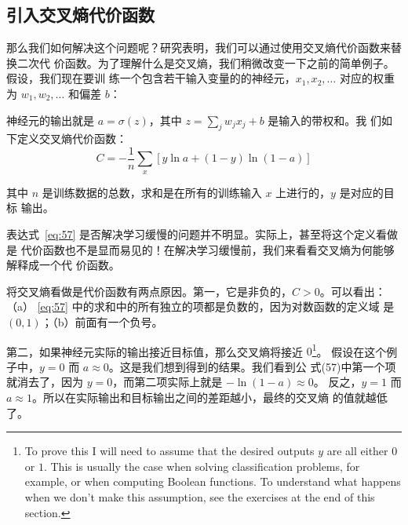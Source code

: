 \subsection{引入交叉熵代价函数}
\label{sec:introducing_the_cross-entropy_cost_function}

那么我们如何解决这个问题呢？研究表明，我们可以通过使用交叉熵代价函数来替换二次代
价函数。为了理解什么是交叉熵，我们稍微改变一下之前的简单例子。假设，我们现在要训
练一个包含若干输入变量的的神经元，$x_1, x_2, \ldots$ 对应的权重为 $w_1, w_2,
\ldots$ 和偏差 $b$：

\begin{center}
\end{center}

神经元的输出就是 $a = \sigma(z)$，其中 $z = \sum_j w_j x_j+b$ 是输入的带权和。我
们如下定义交叉熵代价函数：
\begin{equation} 
  C = -\frac{1}{n} \sum_x \left[y \ln a + (1-y ) \ln (1-a) \right]
\label{eq:57}\tag{57}
\end{equation}

其中 $n$ 是训练数据的总数，求和是在所有的训练输入 $x$ 上进行的，$y$ 是对应的目标
输出。

表达式~\eqref{eq:57} 是否解决学习缓慢的问题并不明显。实际上，甚至将这个定义看做是
代价函数也不是显而易见的！在解决学习缓慢前，我们来看看交叉熵为何能够解释成一个代
价函数。

将交叉熵看做是代价函数有两点原因。第一，它是非负的，$C > 0$。可以看出：
（a） \eqref{eq:57} 中的求和中的所有独立的项都是负数的，因为对数函数的定义域
是 $(0,1)$；（b）前面有一个负号。

第二，如果神经元实际的输出接近目标值，那么交叉熵将接近 $0$\footnote{To prove
  this I will need to assume that the desired outputs $y$ are all either $0$ or
  $1$. This is usually the case when solving classification problems, for
  example, or when computing Boolean functions. To understand what happens when
  we don't make this assumption, see the exercises at the end of this section.}。
假设在这个例子中，$y=0$ 而 $a\approx 0$。这是我们想到得到的结果。我们看到公
式(57)中第一个项就消去了，因为 $y=0$，而第二项实际上就是 $-\ln (1-a)\approx 0$。
反之，$y=1$ 而 $a\approx 1$。所以在实际输出和目标输出之间的差距越小，最终的交叉熵
的值就越低了。

